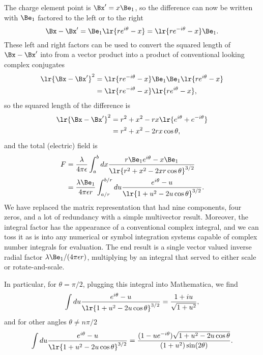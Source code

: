 The charge element point is \( \Bx' = x \Be_1 \), so the difference can now be written with \( \Be_1 \) factored to the left or to the right
\begin{equation}\label{eqn:linecharge:20}
\Bx - \Bx'
= \Be_1\lr{ r e^{i\theta} - x }
= \lr{ r e^{-i\theta} - x } \Be_1.
\end{equation}
These left and right factors can be used to convert the squared length of \( \Bx - \Bx' \) into from a vector product into a product of conventional looking complex conjugates
\begin{equation}\label{eqn:linecharge:40}
\begin{aligned}
\lr{ \Bx - \Bx' }^2
&= \lr{ r e^{-i\theta} - x } \Be_1 \Be_1\lr{ r e^{i\theta} - x } \\
&= \lr{ r e^{-i\theta} - x } \lr{ r e^{i\theta} - x },
\end{aligned}
\end{equation}
so the squared length of the difference is
\begin{equation}\label{eqn:linecharge:300}
\begin{aligned}
\lr{ \Bx - \Bx' }^2
&= r^2 + x^2 - r x \lr{ e^{i\theta} + e^{-i\theta} } \\
&= r^2 + x^2 - 2 r x \cos\theta,
\end{aligned}
\end{equation}
and the total (electric) field is
\begin{equation}\label{eqn:linecharge:60}
\begin{aligned}
F
&= \frac{\lambda}{4 \pi \epsilon} \int_a^b dx \frac{ r \Be_1 e^{i\theta} - x \Be_1 }{ \lr{ r^2 + x^2 - 2 x r \cos\theta }^{3/2} } \\
&= \frac{\lambda \Be_1}{4 \pi \epsilon r} \int_{a/r}^{b/r} du \frac{ e^{i\theta} - u }{ \lr{ 1 + u^2 - 2 u \cos\theta }^{3/2} }.
\end{aligned}
\end{equation}
We have replaced the matrix representation that had nine components, four zeros, and a lot of redundancy with a simple multivector result.
Moreover, the integral factor has the appearance of a conventional complex integral, and we can toss it as is into any numerical or symbol integration systems capable of complex number integrals for evaluation.
The end result is a single vector valued inverse radial factor \( \lambda \Be_1/ (4 \pi \epsilon r) \), multiplying by an integral that served to either scale or rotate-and-scale.

In particular, for \( \theta = \pi/2 \), plugging this integral into Mathematica, we find
\begin{dmath}\label{eqn:linecharge:80}
\int
du \frac{ e^{i\theta} - u }{ \lr{ 1 + u^2 - 2 u \cos\theta }^{3/2} }
= \frac{1 + i u}{\sqrt{1 + u^2}},
\end{dmath}
and for other angles \( \theta \neq n \pi/2 \)
\begin{dmath}\label{eqn:linecharge:100}
\int
du \frac{ e^{i\theta} - u }{ \lr{ 1 + u^2 - 2 u \cos\theta }^{3/2} }
= \frac{(1 -u e^{-i\theta}) \sqrt{1 + u^2 - 2 u \cos\theta}}{(1 + u^2) \sin(2\theta)}.
\end{dmath}

